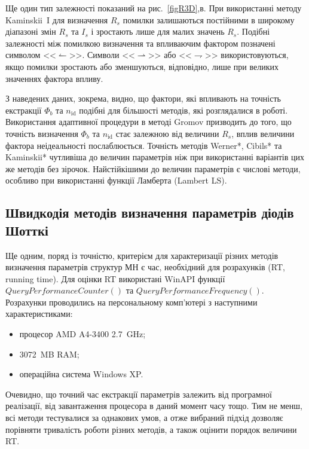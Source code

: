 Ще один тип залежності показаний на рис.~\ref{figR3D},в.
При використанні методу Kaminskii~I для визначення  $R_s$ помилки залишаються постійними в широкому діапазоні змін $R_s$ та $I_s$ і зростають лише для малих значень $R_s$.
Подібні залежності між помилкою визначення та впливаючим фактором позначені символом <<$\leftharpoonup$>>.
Символи <<$\rightharpoonup$>> або <<$\rightharpoondown$>> використовуються, якщо помилки зростають або зменшуються, відповідно, лише при великих значеннях фактора впливу.

З наведених даних, зокрема, видно, що фактори, які впливають на точність екстракції $\Phi_b$ та  $n_\mathrm{id}$ подібні для більшості методів, які розглядалися в роботі.
Використання адаптивної процедури в методі Gromov призводить до того, що точність визначення $\Phi_b$ та  $n_\mathrm{id}$ стає залежною від величини $R_s$, вплив величини фактора неідеальності послаблюється.
Точність методів Werner*, Cibils* та Kaminskii* чутливіша до величин параметрів ніж при використанні варіантів цих же методів без зірочок.
Найстійкішими до величин параметрів є числові методи, особливо при використанні функції Ламберта (Lambert LS).


\subsection{Швидкодія методів визначення параметрів діодів Шотткі}
Ще одним, поряд із точністю, критерієм для характеризації різних методів визначення параметрів структур МН є час, необхідний для розрахунків (RT, running time).
Для оцінки RT  використані WinAPI функції $QueryPerformanceCounter()$ та $QueryPerformanceFrequency()$.
Розрахунки проводились на персональному комп'ютері з наступними характеристиками:
\begin{itemize}[leftmargin=0em,itemindent=1.5em]
  \item процесор AMD A4-3400 2.7~GHz;
  \item 3072~MB RAM;
  \item операційна система Windows XP.
\end{itemize}
Очевидно, що точний час екстракції параметрів залежить від програмної реалізації, від завантаження процесора в даний момент часу тощо.
Тим не менш, всі методи тестувалися за однакових умов, а отже вибраний підхід дозволяє порівняти тривалість роботи різних методів, а також оцінити порядок величини RT.

